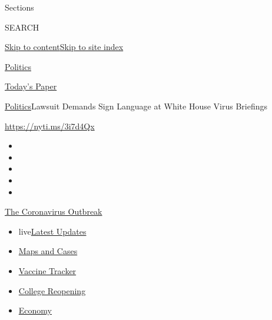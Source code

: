 Sections

SEARCH

\protect\hyperlink{site-content}{Skip to
content}\protect\hyperlink{site-index}{Skip to site index}

\href{https://www.nytimes3xbfgragh.onion/section/politics}{Politics}

\href{https://myaccount.nytimes3xbfgragh.onion/auth/login?response_type=cookie\&client_id=vi}{}

\href{https://www.nytimes3xbfgragh.onion/section/todayspaper}{Today's
Paper}

\href{/section/politics}{Politics}\textbar{}Lawsuit Demands Sign
Language at White House Virus Briefings

\url{https://nyti.ms/3i7d4Qx}

\begin{itemize}
\item
\item
\item
\item
\item
\end{itemize}

\href{https://www.nytimes3xbfgragh.onion/news-event/coronavirus?action=click\&pgtype=Article\&state=default\&region=TOP_BANNER\&context=storylines_menu}{The
Coronavirus Outbreak}

\begin{itemize}
\tightlist
\item
  live\href{https://www.nytimes3xbfgragh.onion/2020/08/04/world/coronavirus-cases.html?action=click\&pgtype=Article\&state=default\&region=TOP_BANNER\&context=storylines_menu}{Latest
  Updates}
\item
  \href{https://www.nytimes3xbfgragh.onion/interactive/2020/us/coronavirus-us-cases.html?action=click\&pgtype=Article\&state=default\&region=TOP_BANNER\&context=storylines_menu}{Maps
  and Cases}
\item
  \href{https://www.nytimes3xbfgragh.onion/interactive/2020/science/coronavirus-vaccine-tracker.html?action=click\&pgtype=Article\&state=default\&region=TOP_BANNER\&context=storylines_menu}{Vaccine
  Tracker}
\item
  \href{https://www.nytimes3xbfgragh.onion/2020/08/02/us/covid-college-reopening.html?action=click\&pgtype=Article\&state=default\&region=TOP_BANNER\&context=storylines_menu}{College
  Reopening}
\item
  \href{https://www.nytimes3xbfgragh.onion/live/2020/08/04/business/stock-market-today-coronavirus?action=click\&pgtype=Article\&state=default\&region=TOP_BANNER\&context=storylines_menu}{Economy}
\end{itemize}

